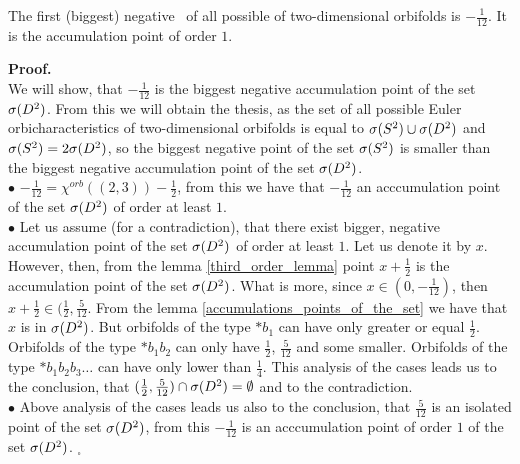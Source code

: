 \begin{theorem}
The first (biggest) negative \apots\ of all possible \Eoc of two-dimensional orbifolds is 
$-\frac{1}{12}$. It is the accumulation point of order $1$. 
\end{theorem}
\noindent\textbf{Proof.} \\
We will show, that $-\frac{1}{12}$ is the biggest negative accumulation point of the set ${\mathcal{\sigma}(D^2)}$. 
From this we will obtain the thesis, as the set of all possible Euler orbicharacteristics 
of two-dimensional orbifolds is equal to ${\mathcal{\sigma}(S^2)} \cup {\mathcal{\sigma}(D^2)}$ and ${\mathcal{\sigma}(S^2)} = 2{\mathcal{\sigma}(D^2)}$, so 
the biggest negative point of the set ${\mathcal{\sigma}(S^2)}$ is smaller than the biggest negative accumulation 
point of the set ${\mathcal{\sigma}(D^2)}$. \\
$\bullet$ $-\frac{1}{12}=\chi^{orb}((2,3))-\frac{1}{2}$, from this we have that $-\frac{1}{12}$ 
an acccumulation point of the set ${\mathcal{\sigma}(D^2)}$ of order at least $1$. \\
$\bullet$ Let us assume (for a contradiction), that there exist bigger, negative 
accumulation point of the set ${\mathcal{\sigma}(D^2)}$ of order at least $1$. Let us denote it by $x$. \\
However, then, from the lemma \ref{third_order_lemma} point $x+\frac{1}{2}$ is the accumulation 
point of the set ${\mathcal{\sigma}(D^2)}$. What is more, since $x\in (0, -\frac{1}{12})$, then $x+\frac{1}{2} 
\in (\frac{1}{2}, \frac{5}{12}$. From the lemma \ref{accumulations_points_of_the_set} we 
have that $x$ is in ${\mathcal{\sigma}(D^2)}$. But orbifolds of the type $*b_1$ can have \Eoc only greater or 
equal $\frac{1}{2}$. Orbifolds of the type $*b_1b_2$ can only have \Eoc $\frac{1}{2}$, 
$\frac{5}{12}$ and some smaller. Orbifolds of the type $*b_1b_2b_3\dots$ can have \Eoc only 
lower than $\frac{1}{4}$. This analysis of the cases leads us to the conclusion, that 
$(\frac{1}{2},\frac{5}{12})\cap {\mathcal{\sigma}(D^2)}=\emptyset$ and to the contradiction. \\
$\bullet$ Above analysis of the cases leads us also to the conclusion, that $\frac{5}{12}$ 
is 
an isolated point of the set ${\mathcal{\sigma}(D^2)}$, from this $-\frac{1}{12}$ is an acccumulation point 
of order $1$ of the set ${\mathcal{\sigma}(D^2)}$. $_\square$ \\ 
 








